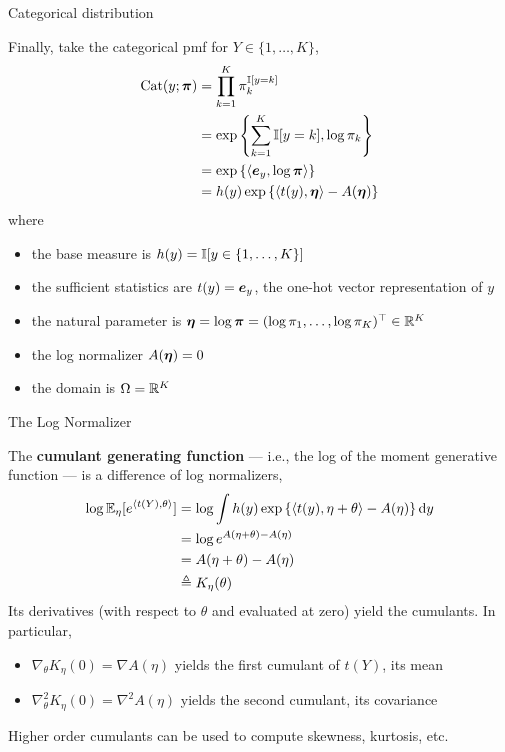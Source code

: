 \documentclass[aspectratio=169]{beamer}
\begin{document}
\begin{frame}[t,allowframebreaks]{Categorical distribution}\label{categorical-distribution}

Finally, take the categorical pmf for \(Y \in \{1, \ldots, K\}\),
\begin{align*}
    \mathrm{Cat}(y; \boldsymbol{\pi}) 
    &= \prod_{k=1}^K \pi_k^{\mathbb{I}[y = k]} \\
    &= \exp \left\{ \sum_{k=1}^K \mathbb{I}[y=k], \log \pi_k \right \} \\
    &= \exp \left\{ \langle \boldsymbol{e}_y, \log \boldsymbol{\pi} \rangle \right \} \\
    &= h(y) \exp \left\{ \langle t(y), \boldsymbol{\eta} \rangle - A(\boldsymbol{\eta}) \right \} 
\end{align*} where 
\begin{itemize}
    \item the base measure is \(h(y) = \mathbb{I}[y \in \{1,\ldots,K\}]\) 
    \item the sufficient statistics are \(t(y) = \boldsymbol{e}_y\), the one-hot vector representation of \(y\) 
    \item the natural parameter is \(\boldsymbol{\eta} = \log \boldsymbol{\pi} = (\log \pi_1, \ldots, \log \pi_K)^\top \in \mathbb{R}^K\)
    \item the log normalizer \(A(\boldsymbol{\eta}) = 0\) 
    \item the domain is \(\Omega = \mathbb{R}^K\)
\end{itemize}
\end{frame}

\begin{frame}[t,allowframebreaks]{The Log Normalizer}\label{the-log-normalizer}

The \textbf{cumulant generating function} --- i.e., the log of the
moment generative function --- is a difference of log normalizers,
\begin{align*}
\log \mathbb{E}_\eta[e^{\langle t(Y), \theta \rangle}] 
&= \log \int h(y) \exp \left\{ \langle t(y), \eta + \theta \rangle - A(\eta) \right\} \mathop{}\!\mathrm{d} y \\
&= \log e^{A(\eta + \theta) - A(\eta)} \\
&= A(\eta + \theta) - A(\eta) \\
&\triangleq K_\eta(\theta)
\end{align*} Its derivatives (with respect to \(\theta\) and evaluated
at zero) yield the cumulants. In particular, 
\begin{itemize}
    \item \(\nabla_\theta K_\eta(0) = \nabla A(\eta)\) yields the first cumulant
of \(t(Y)\), its mean 
    \item \(\nabla^2_\theta K_\eta(0) = \nabla^2 A(\eta)\) yields the second cumulant, its covariance
\end{itemize}

Higher order cumulants can be used to compute skewness, kurtosis, etc.
\end{frame}
\end{document}
